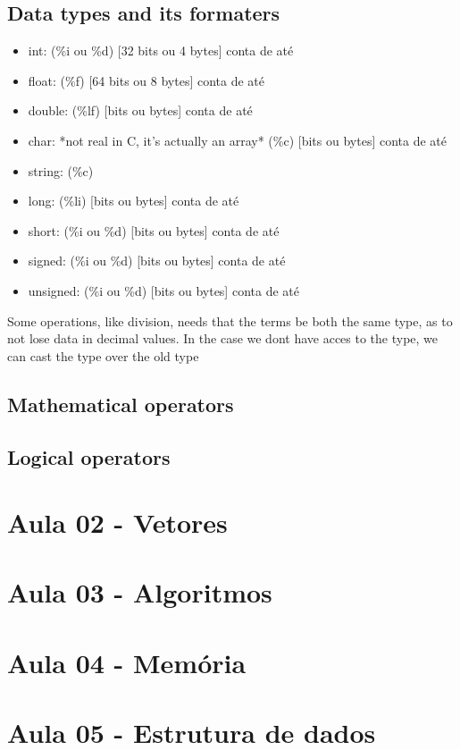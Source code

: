 \documentclass[12pt,a4paper]{article} %
\begin{document}
\subsection{Data types and its formaters}
\begin{itemize}
\item int: (\%i ou \%d) [32 bits ou 4 bytes] conta de até
\item float: (\%f) [64 bits ou 8 bytes] conta de até 
\item double: (\%lf) [bits ou bytes] conta de até
\item char: *not real in C, it's actually an array* (\%c) [bits ou bytes] conta de até
\item string: (\%c)
\item long: (\%li) [bits ou bytes] conta de até
\item short: (\%i ou \%d) [bits ou bytes] conta de até
\item signed: (\%i ou \%d) [bits ou bytes] conta de até
\item unsigned: (\%i ou \%d) [bits ou bytes] conta de até
\end{itemize}
Some operations, like division, needs that the terms be both the same type, as to not lose data in decimal values. In the case we dont have acces to the type, we can cast the type over the old type

\subsection{Mathematical operators}

\subsection{Logical operators}

\section{Aula 02 - Vetores}

\section{Aula 03 - Algoritmos}

\section{Aula 04 - Memória}

\section{Aula 05 - Estrutura de dados}
\end{document}
